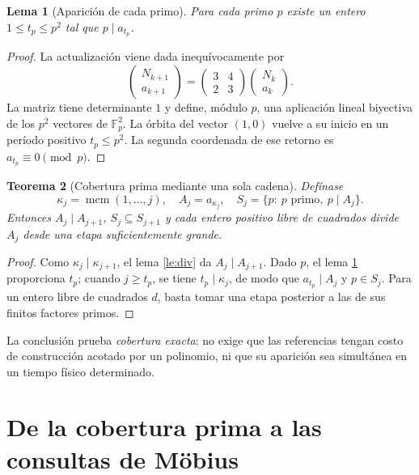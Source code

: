 \documentclass[11pt,a4paper]{article}
\theoremstyle{mine}
\newtheorem{teorema}{Teorema}[section]
\newtheorem{lema}[teorema]{Lema}
\theoremstyle{definition}
\begin{document}
\begin{lema}[Aparición de cada primo]\label{le:orbit}
Para cada primo $p$ existe un entero $1\le t_p\le p^2$ tal que $p\mid a_{t_p}$.
\end{lema}
\begin{proof}
La actualización viene dada inequívocamente por
\[
\begin{pmatrix}N_{k+1}\\a_{k+1}\end{pmatrix}
=\begin{pmatrix}3&4\\2&3\end{pmatrix}
\begin{pmatrix}N_k\\a_k\end{pmatrix}.
\]
La matriz tiene determinante $1$ y define, módulo $p$, una aplicación lineal biyectiva de los $p^2$ vectores de $\mathbb F_p^2$. La órbita del vector $(1,0)$ vuelve a su inicio en un período positivo $t_p\le p^2$. La segunda coordenada de ese retorno es $a_{t_p}\equiv0\pmod p$.
\end{proof}

\begin{teorema}[Cobertura prima mediante una sola cadena]\label{th:coverage}
Defínase
\begin{equation}\label{eq:chain}
\kappa_j=\operatorname{mcm}(1,\ldots,j),\quad A_j=a_{\kappa_j},
\quad S_j=\{p:\ p\text{ primo},\ p\mid A_j\}.
\end{equation}
Entonces $A_j\mid A_{j+1}$, $S_j\subseteq S_{j+1}$ y cada entero positivo libre de cuadrados divide $A_j$ desde una etapa suficientemente grande.
\end{teorema}
\begin{proof}
Como $\kappa_j\mid\kappa_{j+1}$, el lema \ref{le:div} da $A_j\mid A_{j+1}$. Dado $p$, el lema \ref{le:orbit} proporciona $t_p$; cuando $j\ge t_p$, se tiene $t_p\mid\kappa_j$, de modo que $a_{t_p}\mid A_j$ y $p\in S_j$. Para un entero libre de cuadrados $d$, basta tomar una etapa posterior a las de sus finitos factores primos.
\end{proof}

La conclusión prueba \emph{cobertura exacta}: no exige que las referencias tengan costo de construcción acotado por un polinomio, ni que su aparición sea simultánea en un tiempo físico determinado.

\section{De la cobertura prima a las consultas de Möbius}
\end{document}
